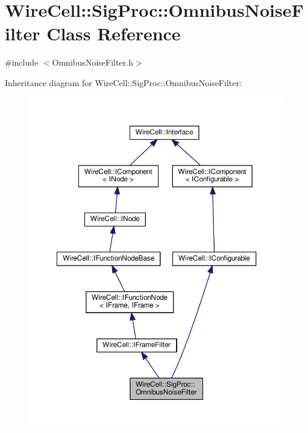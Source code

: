 \hypertarget{class_wire_cell_1_1_sig_proc_1_1_omnibus_noise_filter}{}\section{Wire\+Cell\+:\+:Sig\+Proc\+:\+:Omnibus\+Noise\+Filter Class Reference}
\label{class_wire_cell_1_1_sig_proc_1_1_omnibus_noise_filter}


{\ttfamily \#include $<$Omnibus\+Noise\+Filter.\+h$>$}



Inheritance diagram for Wire\+Cell\+:\+:Sig\+Proc\+:\+:Omnibus\+Noise\+Filter\+:
\nopagebreak
\begin{figure}[H]
\begin{center}
\leavevmode
\includegraphics[width=350pt]{class_wire_cell_1_1_sig_proc_1_1_omnibus_noise_filter__inherit__graph}
\end{center}
\end{figure}


